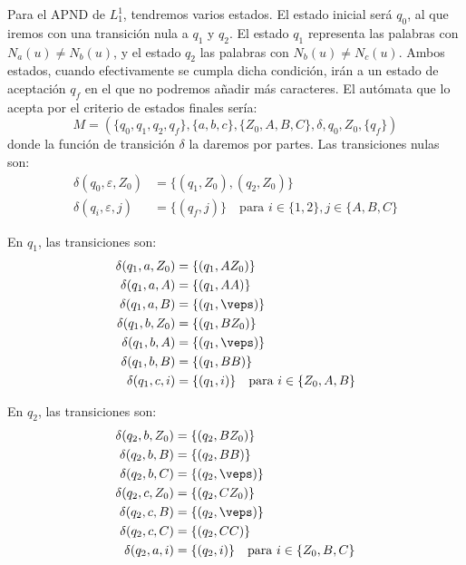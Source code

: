 \documentclass[12pt]{article}
\begin{document}
\begin{ejercicio}[2.5 puntos]
\begin{enumerate}
\begin{description}
                Para el APND de $L_1^1$, tendremos varios estados. El estado inicial será $q_0$, al que iremos con una transición nula a $q_1$ y $q_2$. El estado $q_1$ representa las palabras con $N_a(u)\neq N_b(u)$, y el estado $q_2$ las palabras con $N_b(u)\neq N_c(u)$. Ambos estados, cuando efectivamente se cumpla dicha condición, irán a un estado de aceptación $q_f$ en el que no podremos añadir más caracteres. El autómata que lo acepta por el criterio de estados finales sería:
                \begin{equation*}
                    M=(\{q_0,q_1,q_2,q_f\},\{a,b,c\},\{Z_0,A,B,C\},\delta,q_0,Z_0,\{q_f\})
                \end{equation*}
                donde la función de transición $\delta$ la daremos por partes. Las transiciones nulas son:
                \begin{align*}
                    \delta(q_0,\varepsilon,Z_0) &= \{(q_1,Z_0),(q_2,Z_0)\}\\
                    \delta(q_i,\varepsilon,j) &= \{(q_f,j)\} \quad \text{para } i\in \{1,2\}, j\in \{A,B,C\}
                \end{align*}

                En $q_1$, las transiciones son:
                \begin{align*}
                    \delta(q_1,a,Z_0) &= \{(q_1,AZ_0)\}\\
                    \delta(q_1,a,A) &= \{(q_1,AA)\}\\
                    \delta(q_1,a,B) &= \{(q_1,\veps)\}\\
                    \delta(q_1,b,Z_0) &= \{(q_1,BZ_0)\}\\
                    \delta(q_1,b,A) &= \{(q_1,\veps)\}\\
                    \delta(q_1,b,B) &= \{(q_1,BB)\}\\
                    \delta(q_1,c,i) &= \{(q_1,i)\} \quad \text{para } i\in \{Z_0,A,B\}
                \end{align*}

                En $q_2$, las transiciones son:
                \begin{align*}
                    \delta(q_2,b,Z_0) &= \{(q_2,BZ_0)\}\\
                    \delta(q_2,b,B) &= \{(q_2,BB)\}\\
                    \delta(q_2,b,C) &= \{(q_2,\veps)\}\\
                    \delta(q_2,c,Z_0) &= \{(q_2,CZ_0)\}\\
                    \delta(q_2,c,B) &= \{(q_2,\veps)\}\\
                    \delta(q_2,c,C) &= \{(q_2,CC)\}\\
                    \delta(q_2,a,i) &= \{(q_2,i)\} \quad \text{para } i\in \{Z_0,B,C\}
                \end{align*}


\end{description}
\end{enumerate}
\end{ejercicio}
\end{document}
